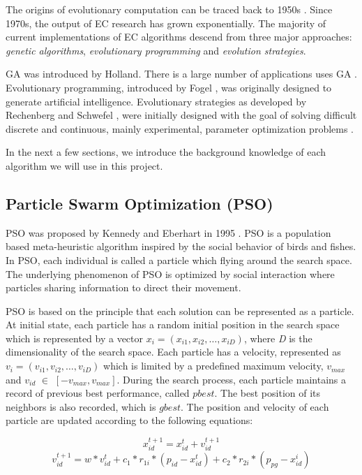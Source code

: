 The origins of evolutionary computation can be traced back to 1950s \cite{back1997evolutionary}. Since 1970s, the output of EC research has grown exponentially. 
The majority of current implementations of EC algorithms descend from three major approaches: \emph{genetic algorithms}, \emph{evolutionary programming}
and \emph{evolution strategies}.

GA \cite{holland1962outline} was introduced by Holland. There is a large number of applications uses GA \cite{de1992genetic, de1993genetic}.
Evolutionary programming, introduced by Fogel \cite{fogel1962autonmous}, was originally designed to generate artificial intelligence. 
Evolutionary strategies as developed by Rechenberg \cite{rechenberg1971} and Schwefel \cite{Schwefel1975}, were initially designed with the goal of solving difficult discrete
and continuous, mainly experimental, parameter optimization problems \cite{klock}. 

In the next a few sections, we introduce the background knowledge of each
algorithm we will use in this project.


\subsection{Particle Swarm Optimization (PSO)}
PSO was proposed by Kennedy and Eberhart in 1995 \cite{488968}. PSO is a population based meta-heuristic algorithm 
inspired by the social behavior of birds and fishes. In PSO, each individual is called a particle which flying
around the search space. The underlying phenomenon of PSO is optimized by social interaction 
where particles sharing information to direct their movement.


PSO is based on the principle that each solution can be represented as a 
particle. At initial state, each particle has a random initial position in the 
search space which is represented by a vector $x_i = (x_{i1}, x_{i2}, \dots, x_{iD})$, where \emph{D} is the dimensionality of the search space.
Each particle has a velocity, represented as $v_i = (v_{i1}, v_{i2}, \dots, v_{iD})$ which is limited by a 
predefined maximum velocity, $v_{max}$ and  $v_{id}$ $\in$ $[-v_{max}, v_{max}]$. 
During the search process, each particle maintains a record of previous best performance, called $pbest$. The best position of its neighbors 
is also recorded, which is $gbest$. The position and velocity of each particle are 
updated according to the following equations:

\begin{equation}
	x^{t+1}_{id} = x^{t}_{id} + v^{t+1}_{id}
\end{equation}
\begin{equation}
	v^{t+1}_{id} = w * v^{t}_{id} + c_1 * r_{1i} * (p_{id} - x^t_{id}) + c_2 * r_{2i} * (p_{pg} - x^i_{id})
\end{equation}


